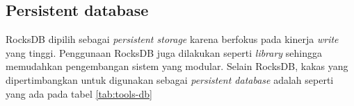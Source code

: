 \subsection{Persistent database}
RocksDB dipilih sebagai \textit{persistent storage} karena berfokus pada kinerja \textit{write} yang tinggi. Penggunaan RocksDB juga dilakukan seperti \textit{library} sehingga memudahkan pengembangan sistem yang modular. Selain RocksDB, kakas yang dipertimbangkan untuk digunakan sebagai \textit{persistent database} adalah seperti yang ada pada tabel \ref{tab:tools-db}

\begin{table}[h]
    \centering
    \caption{Perbandingan kakas persistent database}
    \label{tab:tools-db}
\end{table}

